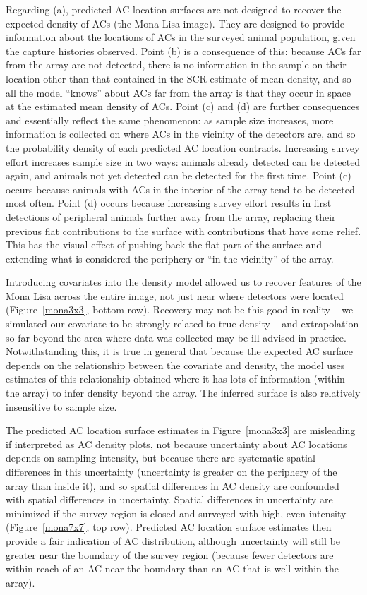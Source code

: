 \documentclass[useAMS,usenatbib,referee]{biom}
\begin{document}
Regarding (a), predicted AC location surfaces are not designed to recover the expected density of ACs (the Mona Lisa image). They are designed to provide information about the locations of ACs in the surveyed animal population, given the capture histories observed. Point (b) is a consequence of this: because ACs far from the array are not detected, there is no information in the sample on their location other than that contained in the SCR estimate of mean density, and so all the model ``knows'' about ACs far from the array is that they occur in space at the estimated mean density of ACs. Point (c) and (d) are further consequences and essentially reflect the same phenomenon: as sample size increases, more information is collected on where ACs in the vicinity of the detectors are, and so the probability density of each predicted AC location contracts. Increasing survey effort increases sample size in two ways: animals already detected can be detected again, and animals not yet detected can be detected for the first time. Point (c) occurs because animals with ACs in the interior of the array tend to be detected most often. Point (d) occurs because increasing survey effort results in first detections of peripheral animals further away from the array, replacing their previous flat contributions to the surface with contributions that have some relief. This has the visual effect of pushing back the flat part of the surface and extending what is considered the periphery or ``in the vicinity'' of the array. 

Introducing covariates into the density model allowed us to recover features of the Mona Lisa across the entire image, not just near where detectors were located (Figure~\ref{mona3x3}, bottom row). Recovery may not be this good in reality -- we simulated our covariate to be strongly related to true density -- and extrapolation so far beyond the area where data was collected may be ill-advised in practice. Notwithstanding this, it is true in general that because the expected AC surface depends on the relationship between the covariate and density, the model uses estimates of this relationship obtained where it has lots of information (within the array) to infer density beyond the array. The inferred surface is also relatively insensitive to sample size.

The predicted AC location surface estimates in Figure~\ref{mona3x3} are misleading if interpreted as AC density plots, not because uncertainty about AC locations depends on sampling intensity, but because there are systematic spatial differences in this uncertainty (uncertainty is greater on the periphery of the array than inside it), and so spatial differences in AC density are confounded with spatial differences in uncertainty. Spatial differences in uncertainty are minimized if the survey region is closed and surveyed with high, even intensity (Figure~\ref{mona7x7}, top row). Predicted AC location surface estimates then provide a fair indication of AC distribution, although uncertainty will still be greater near the boundary of the survey region (because fewer detectors are within reach of an AC near the boundary than an AC that is well within the array). 
\end{document}

